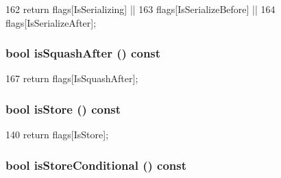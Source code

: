 \begin{DoxyCode}
162                                 { return flags[IsSerializing] ||
163                                       flags[IsSerializeBefore] ||
164                                       flags[IsSerializeAfter]; }
\end{DoxyCode}
\hypertarget{classStaticInst_a11c92e1c9e4b69f9cb64a9794f1fef4c}{
\subsubsection[{isSquashAfter}]{\setlength{\rightskip}{0pt plus 5cm}bool isSquashAfter () const}}
\label{classStaticInst_a11c92e1c9e4b69f9cb64a9794f1fef4c}



\begin{DoxyCode}
167 { return flags[IsSquashAfter]; }
\end{DoxyCode}
\hypertarget{classStaticInst_a75d02c30242181ed8a68f61087c2242d}{
\subsubsection[{isStore}]{\setlength{\rightskip}{0pt plus 5cm}bool isStore () const}}
\label{classStaticInst_a75d02c30242181ed8a68f61087c2242d}



\begin{DoxyCode}
140 { return flags[IsStore]; }
\end{DoxyCode}
\hypertarget{classStaticInst_a7023ade89206ed967e6af7397cb744f8}{
\subsubsection[{isStoreConditional}]{\setlength{\rightskip}{0pt plus 5cm}bool isStoreConditional () const}}
\label{classStaticInst_a7023ade89206ed967e6af7397cb744f8}



